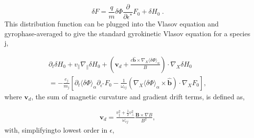 \documentclass[12pt]{article}
\begin{document}
   \begin{equation}
      \delta F = \frac{q}{m}\delta\Phi\frac{\partial}{\partial\epsilon^*}F_0 + \delta H_0\;.
   \end{equation}
This distribution function can be plugged into the Vlasov equation and gyrophase-averaged to give the standard gyrokinetic Vlasov
equation for a species j\cite{FriemanChen},

   \begin{equation}
   \begin{aligned}
      \partial_t\delta H_0 + v_\parallel\nabla_\parallel\delta H_0 +
      (\bm{v}_d + \frac{c\bm{\hat{b}}\times\nabla_X\langle\delta\Phi\rangle_\alpha}{B})\cdot\nabla_X\delta H_0 \\
      = 
      -\frac{e_j}{m_j}[\partial_t\langle\delta\Phi\rangle_\alpha\partial_{\epsilon^*} F_0
      -\frac{1}{\omega_{cj}}(\nabla_X\langle\delta\Phi\rangle_\alpha\times\bm{\hat{b}})\cdot\nabla_X F_0],
   \end{aligned}
   \end{equation}
where $\bm{v}_d$, the sum of magnetic curvature and gradient drift terms, is defined as,

   \begin{equation}
   \begin{aligned}
      \bm{v}_d = \frac{v_\parallel^2 + \frac{1}{2} v_\perp^2}{\omega_{cj}}\frac{\bm{B}\times\nabla B}{B^2},
   \end{aligned}
   \end{equation}
with, simplifyingto lowest order in $\epsilon$,
   
\end{document}
